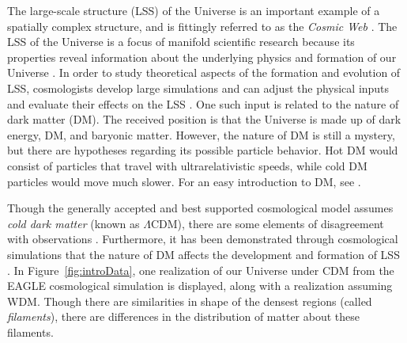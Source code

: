 \documentclass[12pt]{article}
\newcommand{\figref}[1]{Figure~\ref{#1}}
\begin{document}
The large-scale structure (LSS) of the Universe is an important example of a spatially complex structure, and is fittingly referred to as the \emph{Cosmic Web} \citep{bond1996filaments,springel2006large}. The LSS of the Universe is a focus of manifold scientific research because its properties reveal information about the underlying physics and formation of our Universe \citep{davis1985evolution}. In order to study theoretical aspects of the formation and evolution of LSS, cosmologists develop large simulations and can adjust the physical inputs and evaluate their effects on the LSS \citep{cooray2002halo,centrella1983three,doroshkevich1980two,schaye2015eagle}. One such input is related to the nature of dark matter (DM). The received position is that the Universe is made up of dark energy, DM, and baryonic matter. However, the nature of DM is still a mystery, but there are hypotheses regarding its possible particle behavior. Hot DM would consist of particles that travel with ultrarelativistic speeds, while cold DM particles would move much slower. For an easy introduction to DM, see \cite[p. 61-63]{HilbeEtAl2014}.

Though the generally accepted and best supported cosmological model assumes \emph{cold dark matter} (known as $\Lambda$CDM), there are some elements of disagreement with observations \citep{SchneiderEtAl2012}. Furthermore, it has been demonstrated through cosmological simulations that the nature of DM affects the development and formation of LSS \citep{SchneiderEtAl2012}.  
In \figref{fig:introData}, one realization of our Universe under CDM from the EAGLE cosmological simulation \citep{schaye2015eagle} is displayed, along with a realization assuming WDM. Though there are similarities in shape of the densest regions (called \emph{filaments}), there are differences in the distribution of matter about these filaments.
\end{document}
